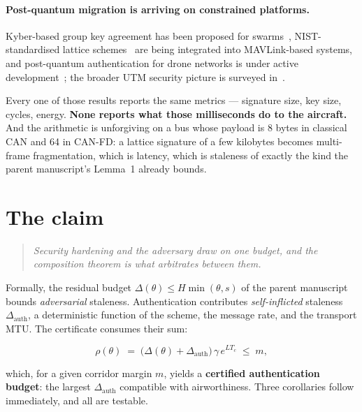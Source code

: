 \documentclass[11pt,a4paper]{article}
\begin{document}
\paragraph{Post-quantum migration is arriving on constrained platforms.}
Kyber-based group key agreement has been proposed for
swarms~\cite{pq_swarm_kyber}, NIST-standardised lattice
schemes~\cite{nist_pqc} are being integrated into MAVLink-based
systems, and post-quantum authentication for drone networks is under active
development~\cite{pq_drone_networks}; the broader UTM security picture is
surveyed in~\cite{utm_survey2026}.

Every one of those results reports the same metrics --- signature size, key
size, cycles, energy. \textbf{None reports what those milliseconds do to the
aircraft.} And the arithmetic is unforgiving on a bus whose payload is 8 bytes
in classical CAN and 64 in CAN-FD: a lattice signature of a few kilobytes
becomes multi-frame fragmentation, which is latency, which is staleness of
exactly the kind the parent manuscript's Lemma~1 already bounds.

\section{The claim}
\begin{quote}\itshape
Security hardening and the adversary draw on one budget, and the composition
theorem is what arbitrates between them.
\end{quote}

Formally, the residual budget $\Delta(\theta)\le H\min(\theta,s)$ of the parent
manuscript bounds \emph{adversarial} staleness. Authentication contributes
\emph{self-inflicted} staleness $\Delta_{\mathrm{auth}}$, a deterministic
function of the scheme, the message rate, and the transport MTU. The certificate
consumes their sum:

\begin{equation}
\label{eq:budget}
\rho(\theta) \;=\;
\big(\Delta(\theta) + \Delta_{\mathrm{auth}}\big)\,
\gamma\, e^{L T_c} \;\le\; m ,
\end{equation}

which, for a given corridor margin $m$, yields a \textbf{certified
authentication budget}: the largest $\Delta_{\mathrm{auth}}$ compatible with
airworthiness. Three corollaries follow immediately, and all are testable.
\end{document}
